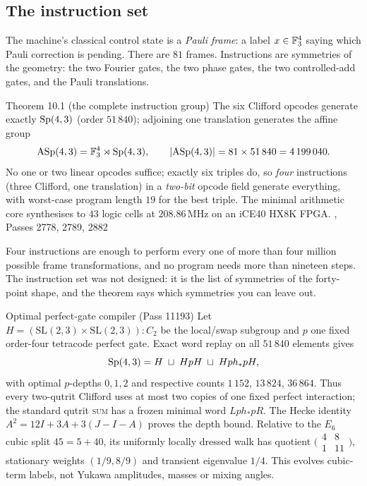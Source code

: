 \subsection{The instruction set}

The machine's classical control state is a \emph{Pauli frame}: a label $x\in\mathbb{F}_3^4$ saying
which Pauli correction is pending. There are $81$ frames. Instructions are symmetries of
the geometry: the two Fourier gates, the two phase gates, the two controlled-add gates, and
the Pauli translations.

\begin{result}{Theorem 10.1 (the complete instruction group) \hfill \tierC}
The six Clifford opcodes generate exactly $\mathrm{Sp}(4,3)$ (order $51\,840$); adjoining one
translation generates the affine group
\[
\mathrm{ASp}(4,3)=\mathbb{F}_3^4\rtimes\mathrm{Sp}(4,3),\qquad |\mathrm{ASp}(4,3)|=81\times51\,840=4\,199\,040 .
\]
No one or two linear opcodes suffice; exactly six triples do, so \emph{four} instructions
(three Clifford, one translation) in a \emph{two-bit} opcode field generate everything, with
worst-case program length $19$ for the best triple. The minimal arithmetic core synthesises
to $43$ logic cells at $208.86$\,MHz on an iCE40 HX8K FPGA.
, Passes 2778, 2789, 2882
\end{result}

\begin{plainwords}
Four instructions are enough to perform every one of more than four million possible
frame transformations, and no program needs more than nineteen steps. The instruction set
was not designed: it is the list of symmetries of the forty-point shape, and the
theorem says which symmetries you can leave out.
\end{plainwords}

\begin{result}{Optimal perfect-gate compiler (Pass 11193) \hfill \tierC}
Let $H=(\mathrm{SL}(2,3)\times\mathrm{SL}(2,3)){:}C_2$ be the local/swap subgroup and $p$ one
fixed order-four tetracode perfect gate.  Exact word replay on all $51\,840$ elements gives
\[
  \mathrm{Sp}(4,3)=H\;\sqcup\;HpH\;\sqcup\;Hp h_*pH,
\]
with optimal $p$-depths $0,1,2$ and respective counts $1\,152$, $13\,824$,
$36\,864$.  Thus every two-qutrit Clifford uses at most two copies of one fixed
perfect interaction; the standard qutrit \textsc{sum} has a frozen minimal word
$Lph_*pR$.  The Hecke identity $A^2=12I+3A+3(J-I-A)$ proves the depth bound.
Relative to the $E_6$ cubic split $45=5+40$, its uniformly locally dressed walk has
quotient $\bigl(\begin{smallmatrix}4&8\\1&11\end{smallmatrix}\bigr)$, stationary
weights $(1/9,8/9)$ and transient eigenvalue $1/4$.  This evolves cubic-term labels,
not Yukawa amplitudes, masses or mixing angles.
\end{result}

